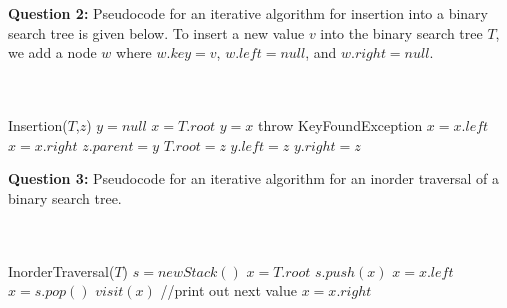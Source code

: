 \documentclass[11pt]{article}
\theoremstyle{plain} %
\theoremstyle{definition}
\theoremstyle{example}
\theoremstyle{remark}
\begin{document}
\textbf{Question 2:}
Pseudocode for an iterative algorithm for insertion into a binary search tree is given below. To insert a new value $v$ into the binary search tree $T$, we add a node $w$ where $w.key = v$, $w.left = null$, and $w.right = null$. 


\begin{algorithmic}
\\
\\
Insertion($T$,$z$)
\State $y = null$
\State $x = T.root$
	\State$y = x$
	 	\State throw KeyFoundException
          	\State $x = x.left$
       	\Else
          \State $x = x.right$
       \EndIf
\EndWhile
$z.parent = y$
	\State $T.root = z$
	\State $y.left = z$
\Else
	\State $y.right = z$
\EndIf
\\
\end{algorithmic}

 

\textbf{Question 3:} Pseudocode for an iterative algorithm for an inorder traversal of a binary search tree.

\begin{algorithmic}
\\
\\
InorderTraversal($T$)
\State $s = newStack()$
\State $x = T.root$
          	\State $s.push(x)$
		\State $x = x.left$
       	\Else
         	 \State $x = s.pop()$
	 	\State $visit(x)$ \quad \quad \quad //print out next value
		\State $x = x.right$
       \EndIf
\EndWhile
\end{algorithmic}
\end{document}
